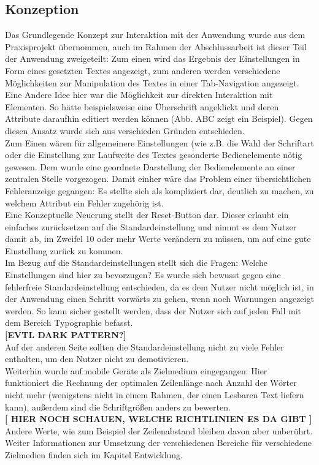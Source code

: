 \subsection{Konzeption}
Das Grundlegende Konzept zur Interaktion mit der Anwendung wurde aus dem Praxisprojekt übernommen, auch im Rahmen der Abschlussarbeit ist dieser Teil der Anwendung zweigeteilt: Zum einen wird das Ergebnis der Einstellungen in Form eines gesetzten Textes angezeigt, zum anderen werden verschiedene Möglichkeiten zur Manipulation des Textes in einer Tab-Navigation angezeigt.\\
Eine Andere Idee hier war die Möglichkeit zur direkten Interaktion mit Elementen. So hätte beispielsweise eine Überschrift angeklickt und deren Attribute daraufhin editiert werden können (Abb. ABC zeigt ein Beispiel). Gegen diesen Ansatz wurde sich aus verschieden Gründen entschieden.\\
Zum Einen wären für allgemeinere Einstellungen (wie z.B. die Wahl der Schriftart oder die Einstellung zur Laufweite des Textes gesonderte Bedienelemente nötig gewesen. Dem wurde eine geordnete Darstellung der Bedienelemente an einer zentralen Stelle vorgezogen. Damit einher wäre das Problem einer übersichtlichen Fehleranzeige gegangen: Es stellte sich als kompliziert dar, deutlich zu machen, zu welchem Attribut ein Fehler zugehörig ist.\\

Eine Konzeptuelle Neuerung stellt der Reset-Button dar. Dieser erlaubt ein einfaches zurücksetzen auf die Standardeinstellung und nimmt es dem Nutzer damit ab, im Zweifel 10 oder mehr Werte verändern zu müssen, um auf eine gute Einstellung zurück zu kommen.\\

Im Bezug auf die Standardeinstellungen stellt sich die Fragen: Welche Einstellungen sind hier zu bevorzugen? Es wurde sich bewusst gegen eine fehlerfreie Standardeinstellung entschieden, da es dem Nutzer nicht möglich ist, in der Anwendung einen Schritt vorwärts zu gehen, wenn noch Warnungen angezeigt werden. So kann sicher gestellt werden, dass der Nutzer sich auf jeden Fall mit dem Bereich Typographie befasst.\\
\textbf{[EVTL DARK PATTERN?]}\\
Auf der anderen Seite sollten die Standardeinstellung nicht zu viele Fehler enthalten, um den Nutzer nicht zu demotivieren.\\

Weiterhin wurde auf mobile Geräte als Zielmedium eingegangen: Hier funktioniert die Rechnung der optimalen Zeilenlänge nach Anzahl der Wörter nicht mehr (wenigstens nicht in einem Rahmen, der einen Lesbaren Text liefern kann), außerdem sind die Schriftgrößen anders zu bewerten.\\
\textbf{[ HIER NOCH SCHAUEN, WELCHE RICHTLINIEN ES DA GIBT ]}\\
Andere Werte, wie zum Beispiel der Zeilenabstand bleiben davon aber unberührt. Weiter Informationen zur Umsetzung der verschiedenen Bereiche für verschiedene Zielmedien finden sich im Kapitel Entwicklung.

